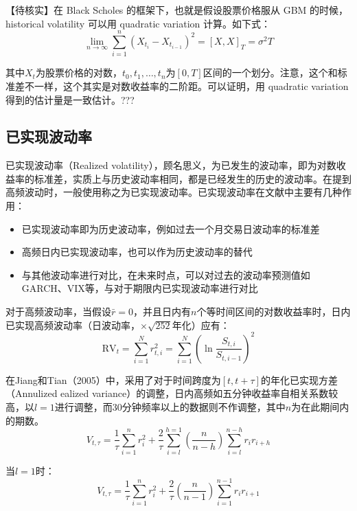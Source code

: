 \documentclass[11pt]{article}
\begin{document}
【待核实】在 Black Scholes 的框架下，也就是假设股票价格服从 GBM 的时候，historical volatility 可以用 quadratic variation 计算。如下式：
\begin{equation*}
    \lim_{n\rightarrow \infty} \sum^{n}_{i=1}(X_{t_i} - X_{t_{i-1}})^2 = [X,X]_T = \sigma^2 T
\end{equation*}

其中$X_t$为股票价格的对数，$t_0,t_1,\dots,t_n$为$[0,T]$区间的一个划分。注意，这个和标准差不一样，这个其实是对数收益率的二阶距。可以证明，用 quadratic variation 得到的估计量是一致估计。???

\subsection{已实现波动率}

已实现波动率（Realized volatility），顾名思义，为已发生的波动率，即为对数收益率的标准差，实质上与历史波动率相同，都是已经发生的历史的波动率。在提到高频波动时，一般使用称之为已实现波动率。已实现波动率在文献中主要有几种作用：

\begin{itemize}
    \item 已实现波动率即为历史波动率，例如过去一个月交易日波动率的标准差
    \item 高频日内已实现波动率，也可以作为历史波动率的替代
    \item 与其他波动率进行对比，在未来时点，可以对过去的波动率预测值如GARCH、VIX等，与对于期限内已实现波动率进行对比
\end{itemize}

对于高频波动率，当假设$\bar{r} = 0$，并且日内有$n$个等时间区间的对数收益率时，日内已实现高频波动率（日波动率，$\times \sqrt{252}$年化）应有：
\begin{equation*}
    \text{RV}_t = \sum^{N}_{i=1} r^2_{t,i} = \sum^{N}_{i=1} \left( \ln \frac{S_{t,i}}{S_{t,i-1}} \right)^2
\end{equation*}

在Jiang和Tian（2005）中，采用了对于时间跨度为$[t,t+\tau]$的年化已实现方差（Annulized ealized variance）的调整，日内高频如五分钟收益率自相关系数较高，以$l=1$进行调整，而30分钟频率以上的数据则不作调整，其中$n$为在此期间内的期数。
\begin{equation*}
    V_{t,\tau} = \frac{1}{\tau}\sum_{i=1}^{n} r_i^2 + \frac{2}{\tau}\sum_{i=l}^{h=1}\left( \frac{n}{n-h} \right) \sum_{i=l}^{n-h} r_i r_{i+h}
\end{equation*}

当$l=1$时：
\begin{equation*}
    V_{t,\tau} = \frac{1}{\tau}\sum_{i=1}^{n} r_i^2 + \frac{2}{\tau} \left( \frac{n}{n-1} \right) \sum_{i=1}^{n-1} r_i r_{i+1}
\end{equation*}
\end{document}
